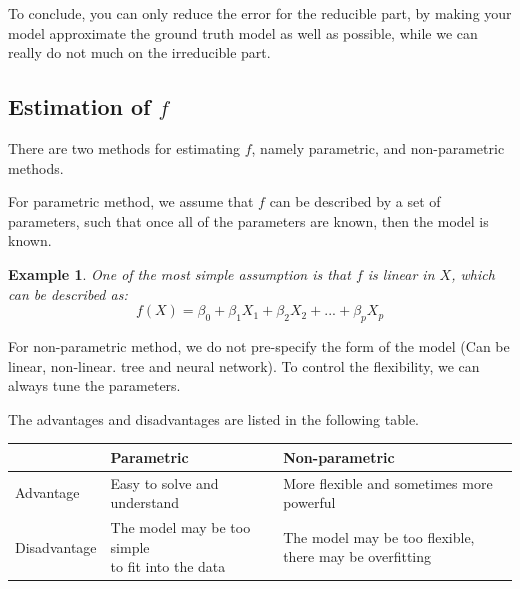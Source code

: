 \documentclass{article}
\theoremstyle{MyNonumberplain}
\theoremstyle{break}
\theoremstyle{break}
\newtheorem{example}{Example}[section]
\begin{document}
To conclude, you can only reduce the error for the reducible part, by making your model approximate the ground truth model as well as possible, 
while we can really do not much on the irreducible part.

\subsection{Estimation of $f$}

There are two methods for estimating $f$, namely parametric, and non-parametric methods.

For parametric method, we assume that $f$ can be described by a set of parameters, such that once all of the parameters are known, then the model is known.

\begin{expbox}
    \begin{example}
        One of the most simple assumption is that $f$ is linear in $X$, which can be described as:  $$f(X)=\beta_0+\beta_1X_1+\beta_2X_2+...+\beta_pX_p$$
    \end{example}
\end{expbox}

For non-parametric method, we do not pre-specify the form of the model (Can be linear, non-linear. tree and neural network). To 
control the flexibility, we can always tune the parameters.

The advantages and disadvantages are listed in the following table.

\begin{table}[!h]
    \centering
    \begin{tabular}{|l|l|l|}
    \hline
                    & Parametric                                       & Non-parametric                                          \\ \hline
    Advantage    & Easy to solve and understand                     & More flexible and sometimes more powerful               \\ \hline
    Disadvantage & \makecell{The model may be too simple\\ to fit into the data} & \makecell{The model may be too flexible, \\there may be overfitting} \\ \hline
    \end{tabular}
\end{table}
\end{document}
